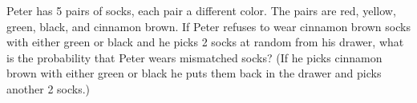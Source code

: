 Peter has 5 pairs of socks, each pair a different color. The pairs are red, yellow, green, black, and cinnamon brown. If Peter refuses to wear cinnamon brown socks with either green or black and he picks 2 socks at random from his drawer, what is the probability that Peter wears mismatched socks? (If he picks cinnamon brown with either green or black he puts them back in the drawer and picks another 2 socks.)
